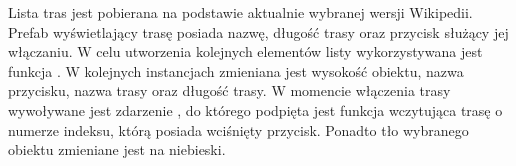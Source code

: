 Lista tras jest pobierana na podstawie aktualnie wybranej wersji Wikipedii. Prefab wyświetlający trasę posiada nazwę, długość trasy oraz przycisk służący jej włączaniu. W celu utworzenia kolejnych elementów listy wykorzystywana jest funkcja  . W kolejnych instancjach zmieniana jest wysokość obiektu, nazwa przycisku, nazwa trasy oraz długość trasy.  W momencie włączenia trasy wywoływane jest zdarzenie  , do którego podpięta jest funkcja   wczytująca trasę o numerze indeksu, którą posiada wciśnięty przycisk. Ponadto tło wybranego obiektu zmieniane jest na niebieski.
